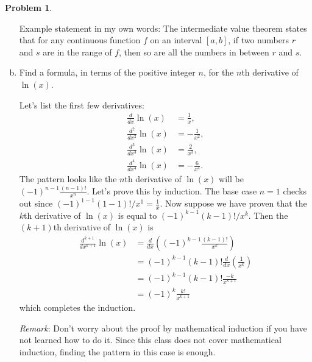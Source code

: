 \documentclass[11pt,oneside]{amsart}
\theoremstyle{definition}
\newtheorem{problem}{Problem}
\begin{document}
\begin{problem}
\begin{enumerate}[(a)]
            \begin{solution}
                Example statement in my own words: The intermediate value theorem states that for any continuous function $f$ on an interval $[a,b]$, if two numbers $r$ and $s$ are in the range of $f$, then so are all the numbers in between $r$ and $s$.
            \end{solution}
            \item Find a formula, in terms of the positive integer $n$, for the $n$th derivative of $\ln(x)$.
            \begin{solution}
                Let's list the first few derivatives:
                \begin{align*}
                    \frac d{dx}\ln(x) &=\frac 1x,\\
                    \frac{d^2}{dx^2}\ln(x) &= -\frac 1{x^2},\\
                    \frac{d^3}{dx^3}\ln(x) &= \frac 2{x^3},\\
                    \frac{d^4}{dx^4}\ln(x) &= -\frac 6{x^4}.
                \end{align*}
                The pattern looks like the $n$th derivative of $\ln(x)$ will be $(-1)^{n-1}\frac{(n-1)!}{x^n}$. Let's prove this by induction. The base case $n=1$ checks out since $(-1)^{1-1}(1-1)!/x^1=\frac 1x$. Now suppose we have proven that the $k$th derivative of $\ln(x)$ is equal to $(-1)^{k-1}(k-1)!/x^k$. Then the $(k+1)$th derivative of $\ln(x)$ is
                \begin{align*}
                    \frac{d^{k+1}}{dx^{k+1}}\ln(x) &= \frac d{dx}\left((-1)^{k-1}\frac{(k-1)!}{x^k}\right)\\
                    &= (-1)^{k-1}(k-1)!\frac d{dx}\left(\frac1{x^k}\right)\\
                    &= (-1)^{k-1}(k-1)!\frac{-k}{x^{k+1}}\\
                    &= (-1)^k \frac{k!}{x^{k+1}}
                \end{align*}
                which completes the induction.

                \emph{Remark}: Don't worry about the proof by mathematical induction if you have not learned how to do it. Since this class does not cover mathematical induction, finding the pattern in this case is enough.
            \end{solution}
        \end{enumerate}
    \end{problem}
\end{document}
